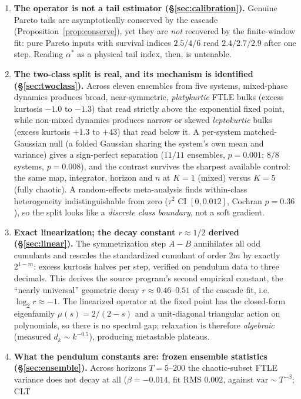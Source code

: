\documentclass[11pt,a4paper]{article}
\theoremstyle{remark}
\begin{document}
\begin{enumerate}
So ``$\alpha^*\approx4$'' turns out to be a metastable plateau reading, not an asymptotic constant.
\item \textbf{The operator is not a tail estimator (\S\ref{sec:calibration}).} Genuine Pareto tails
are asymptotically conserved by the cascade (Proposition~\ref{prop:conserve}), yet they are
\emph{not} recovered by the finite-window fit: pure Pareto inputs with survival indices $2.5/4/6$
read $2.4/2.7/2.9$ after one step. Reading $\alpha^*$ as a physical tail index, then, is untenable.
\item \textbf{The two-class split is real, and its mechanism is identified
(\S\ref{sec:twoclass}).} Across eleven ensembles from five systems, mixed-phase dynamics produces
broad, near-symmetric, \emph{platykurtic} FTLE bulks (excess kurtosis $-1.0$ to $-1.3$) that read
strictly above the exponential fixed point, while non-mixed dynamics produces narrow or skewed
\emph{leptokurtic} bulks (excess kurtosis $+1.3$ to $+43$) that read below it. A per-system
matched-Gaussian null (a folded Gaussian sharing the system's own mean and variance) gives a
sign-perfect separation ($11/11$ ensembles, $p=0.001$; $8/8$ systems, $p=0.008$), and the contrast
survives the sharpest available control: the same map, integrator, horizon and $n$ at $K=1$ (mixed)
versus $K=5$ (fully chaotic). A random-effects meta-analysis finds within-class heterogeneity
indistinguishable from zero ($\tau^2$ CI $[0, 0.012]$, Cochran $p=0.36$), so the split looks like a
\emph{discrete class boundary}, not a soft gradient.
\item \textbf{Exact linearization; the decay constant $r \approx 1/2$ derived
(\S\ref{sec:linear}).} The symmetrization step $A - B$ annihilates all odd cumulants and rescales
the standardized cumulant of order $2m$ by exactly $2^{1-m}$: excess kurtosis halves per step,
verified on pendulum data to three decimals. This derives the source program's second empirical
constant, the ``nearly universal'' geometric decay $r \approx 0.46$--$0.51$ of the cascade fit, i.e.\
$\log_2 r \approx -1$. The linearized operator at the fixed point has the closed-form eigenfamily
$\mu(s) = 2/(2-s)$ and a unit-diagonal triangular action on polynomials, so there is no spectral gap;
relaxation is therefore \emph{algebraic} (measured $d_k \sim k^{-0.5}$), producing metastable
plateaus.
\item \textbf{What the pendulum constants are: frozen ensemble statistics
(\S\ref{sec:ensemble}).} Across horizons $T = 5$--$200$ the chaotic-subset FTLE variance does not
decay at all ($\beta = -0.014$, fit RMS $0.002$, against $\mathrm{var} \sim T^{-\beta}$; CLT

\end{enumerate}
\end{document}
